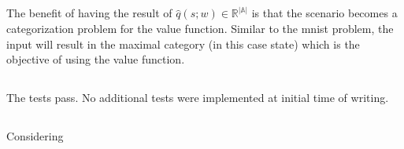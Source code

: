\documentclass{article}
\begin{document}
\subsection{}
The benefit of having the result of $\hat{q}(s;w)\in \mathbb{R}^{|\mathbb{A}|}$
is that the scenario becomes a categorization problem for the value function. 
Similar to the mnist problem, the input will result in the maximal category (in
this case state) which is the objective of using the value function.

\subsection{}
The tests pass. No additional tests were implemented at initial time of writing.

\subsection{}
Considering 
\subsection{}
\end{document}
